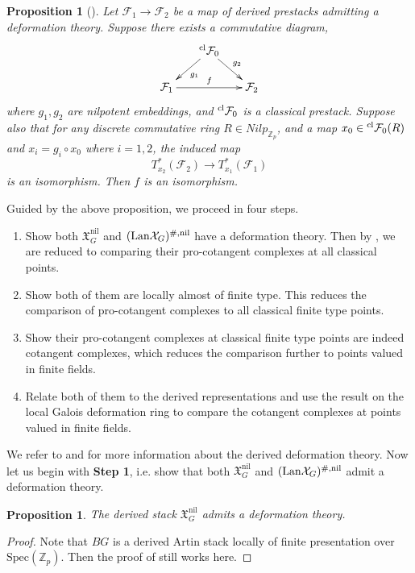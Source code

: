 \documentclass[10pt]{article}
\newtheorem{prop}[thm]{Proposition}
\numberwithin{equation}{section}
\newcommand{\frakX}{{\mathfrak X}}
\newcommand{\bZ}{{\mathbb Z}}
\newcommand{\calF}{{\mathcal F}}
\newcommand{\calX}{{\mathcal X}}
\newcommand{\Lan}{{\mathrm{Lan}}}
\newcommand{\nil}{\mathrm{nil}}
\newcommand{\Spec}{{\mathrm{Spec}}}         %
\begin{document}
\begin{prop}[{\cite[Chapter 1, Proposition 8.3.2]{GR17}}]\label{GR-criterion}
    Let $\calF_1\to \calF_2$ be a map of derived prestacks admitting a deformation theory. Suppose there exists a commutative diagram,
    \begin{equation*}
        \xymatrix@=0.6cm{
        & ^{\rm cl}\calF_0\ar[ld]^{g_1}\ar[rd]^{g_2}&\\
        \calF_1\ar[rr]^{f}&&\calF_2
        }
    \end{equation*}
where $g_1,g_2$ are nilpotent embeddings, and $^{\rm cl}\calF_{0}$ is a classical prestack. Suppose also that for any discrete commutative ring $R\in {Nilp}_{\bZ_p}$, and a map $x_0\in {^{\rm cl}\calF_{0}}(R)$ and $x_i=g_i\circ x_0$ where $i=1,2$, the induced map
    \[
    T^*_{x_2}(\calF_2)\to T^*_{x_1}(\calF_1)
    \]
    is an isomorphism. Then $f$ is an isomorphism.
\end{prop}

Guided by the above proposition, we proceed in four steps.
\begin{enumerate}
    \item[\textbf{Step 1:}]Show both $\frakX_G^{\nil}$ and $(\Lan\calX_G)^{\#,\rm nil}$ have a deformation theory. Then by \cite[Chapter 1, Proposition 8.3.2]{GR17}, we are reduced to comparing their pro-cotangent complexes at all classical points.
    \item[\textbf{Step 2:}] Show both of them are locally almost of finite type. This reduces the comparison of pro-cotangent complexes to all classical finite type points.
    \item[\textbf{Step 3:}] Show their pro-cotangent complexes at classical finite type points are indeed cotangent complexes, which reduces the comparison further to points valued in finite fields.
    \item[\textbf{Step 4:}] Relate both of them to the derived representations and use the result on the local Galois deformation ring to compare the cotangent complexes at points valued in finite fields.
\end{enumerate}


 We refer to \cite[Section 3.1]{Min23} and \cite[Chapter 1]{GR17} for more information about the derived deformation theory. Now let us begin with \textbf{Step 1}, i.e.  show that both $\frakX_G^{\nil}$ and $(\Lan\calX_G)^{\#,\rm nil}$ admit a deformation theory.


\begin{prop}
  The derived stack   $\frakX_G^{\nil}$ admits a deformation theory.
\end{prop}
\begin{proof}
    Note that $BG$ is a derived Artin stack locally of finite presentation over $\Spec(\bZ_p)$. Then the proof of \cite[Proposition 3.25]{Min23} still works here.
\end{proof}
\end{document}
